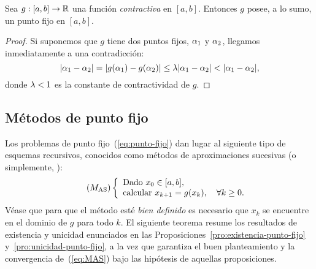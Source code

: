 \begin{proposition}
  \label{pro:unicidad-punto-fijo}
  Sea $g:[a,b]\to\operatorname{{\mathbb R}}$ una función \emph{contractiva} en
  $[a,b]$. Entonces $g$ posee, a lo sumo, un punto fijo en $[a,b]$.
\end{proposition}

\begin{proof}
  Si suponemos que $g$ tiene dos puntos fijos, $\alpha_1$ y
  $\alpha_2$, llegamos inmediatamente a una contradicción:
  $$
  |\alpha_1-\alpha_2| = |g(\alpha_1)-g(\alpha_2)| \le \lambda |\alpha_1 -
  \alpha_2| < |\alpha_1-\alpha_2|,$$
  donde $\lambda<1$ es la constante de contractividad de $g$.
\end{proof}

\subsection*{Métodos de punto fijo}

Los problemas de punto fijo~(\ref{eq:punto-fijo}) dan lugar al
siguiente tipo de esquemas recursivos, conocidos como métodos de
aproximaciones sucesivas (o simplemente, ):
\begin{equation}
  \tag{$M_{\text{AS}}$}
  \left\{
    \begin{array}{l}
      \text{Dado } x_0\in [a,b], \\
      \text{calcular } x_{k+1}=g(x_k), \quad \forall k\ge 0.
    \end{array}
    \right.
  \label{eq:MAS}
\end{equation}
Véase que para que el método esté \textit{bien definido} es necesario
que $x_k$ se encuentre en el dominio de $g$ para todo $k$.
El siguiente teorema resume los resultados de existencia y unicidad
enunciados en las Proposiciones~\ref{pro:existencia-punto-fijo}
y~\ref{pro:unicidad-punto-fijo}, a la vez que garantiza el buen
planteamiento y la convergencia de~(\ref{eq:MAS}) bajo las hipótesis
de aquellas proposiciones.

